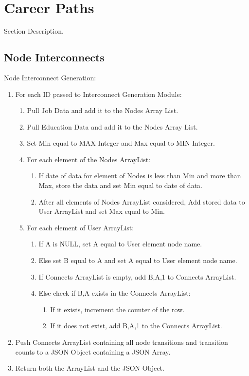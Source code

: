 \section{Career Paths}
\label{sect:career-paths}
Section Description.  

\subsection{Node Interconnects}
Node Interconnect Generation:
\begin{enumerate}
  \item For each ID passed to Interconnect Generation Module:
  \begin{enumerate}
    \item Pull Job Data and add it to the Nodes Array List.
    \item Pull Education Data and add it to the Nodes Array List.
    \item Set Min equal to MAX Integer and Max equal to MIN Integer.
    \item For each element of the Nodes ArrayList:
    \begin{enumerate}
      \item If date of data for element of Nodes is less than Min and more than
      Max, store the data and set Min equal to date of data.
      \item After all elements of Nodes ArrayList considered, Add stored data
      to User ArrayList and set Max equal to Min.
  	\end{enumerate}
  	\item For each element of User ArrayList:
  	\begin{enumerate}
  	  \item If A is NULL, set A equal to User element node name.
  	  \item Else set B equal to A and set A equal to User element node name.
  	  \item If Connects ArrayList is empty, add B,A,1 to Connects ArrayList.
  	  \item Else check if B,A exists in the Connects ArrayList:
  	  \begin{enumerate}
  	    \item If it exists, increment the counter of the row.
  	    \item If it does not exist, add B,A,1 to the Connects ArrayList.
  	  \end{enumerate}
  	\end{enumerate}
  \end{enumerate}
  \item Push Connects ArrayList containing all node transitions and transition
  counts to a JSON Object containing a JSON Array.
  \item Return both the ArrayList and the JSON Object.
\end{enumerate}

